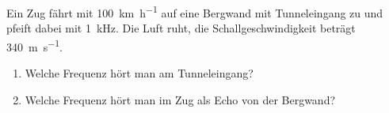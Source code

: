 \begin{ExerciseBlock}
Ein Zug fährt mit \qty{100}{\kilo\metre\per\hour} auf eine Bergwand mit Tunneleingang zu und pfeift dabei mit \qty{1}{\kilo\hertz}. Die Luft ruht, die Schallgeschwindigkeit beträgt \qty{340}{\metre\per\second}.
\begin{enumerate}
\item Welche Frequenz hört man am Tunneleingang?
\item Welche Frequenz hört man im Zug als Echo von der Bergwand?
\end{enumerate}
\end{ExerciseBlock}
